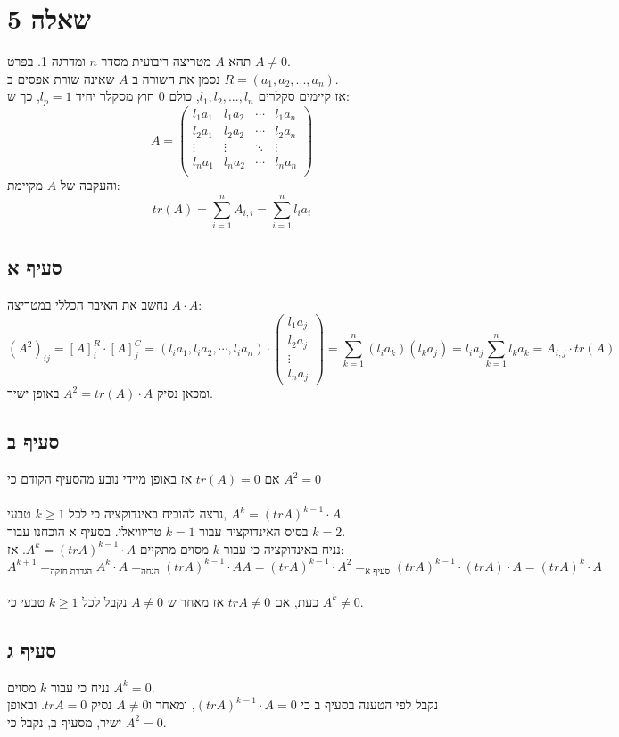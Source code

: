 \documentclass{article}
\DeclareMathOperator*{\equals}{=}
\begin{document}
\pagebreak

\section*{שאלה 5}

תהא $A$ מטריצה ריבועית מסדר $n$ ומדרגה 1. בפרט $A\ne 0$. \\
נסמן את השורה ב $A$ שאינה שורת אפסים ב $R=(a_1, a_2, ..., a_n)$. \\
אז קיימים סקלרים $l_1, l_2, ..., l_n$, כולם 0 חוץ מסקלר יחיד $l_p=1$, כך ש:
\[
    A=\begin{pmatrix}
        l_1a_1 & l_1a_2 & \cdots & l_1a_n \\
        l_2a_1 & l_2a_2 & \cdots & l_2a_n \\
        \vdots & \vdots & \ddots & \vdots \\
        l_na_1 & l_na_2 & \cdots & l_na_n \\
    \end{pmatrix}
\]
והעקבה של $A$ מקיימת:
\[
    tr(A)=
    \sum_{i=1}^n A_{i, i}=
    \sum_{i=1}^n l_ia_i
\]

\subsection*{סעיף א}

נחשב את האיבר הכללי במטריצה $A\cdot A$:
\[
    (A^2)_{ij}=[A]^R_i\cdot [A]^C_j=(l_ia_1, l_ia_2, \cdots, l_ia_n) \cdot \begin{pmatrix}
        l_1a_j \\
        l_2a_j \\
        \vdots \\
        l_na_j
    \end{pmatrix}=
    \sum_{k=1}^n (l_ia_k)(l_k a_j)=
    l_i a_j \sum_{k=1}^n l_ka_k =
    A_{i,j} \cdot tr(A)
\]
ומכאן נסיק $A^2=tr(A) \cdot A$ באופן ישיר.

\subsection*{סעיף ב}
אם $tr(A)=0$ אז באופן מיידי נובע מהסעיף הקודם כי $A^2=0$\\\\
נרצה להוכיח באינדוקציה כי לכל $k\geq 1$ טבעי, $A^k=(tr A)^{k-1}\cdot A$. \\
בסיס האינדוקציה עבור $k=1$ טריוויאלי. בסעיף א הוכחנו עבור $k=2$.\\
נניח באינדוקציה כי עבור $k$ מסוים מתקיים $A^k=(tr A)^{k-1}\cdot A$. אז:
\[
    A^{k+1}\equals_{\text{הגדרת חזקה}}
    A^k \cdot A \equals_{\text{הנחה}}
    (tr A)^{k-1} \cdot AA =
    (tr A)^{k-1} \cdot A^2 \equals_{\text{סעיף א}}
    (tr A)^{k-1} \cdot (tr A) \cdot A =
    (tr A)^k \cdot A
\]
\\
כעת, אם $tr A \ne 0$ אז מאחר ש $A\ne 0$ נקבל לכל $k\geq 1$ טבעי כי $A^k\ne 0$.

\subsection*{סעיף ג}

נניח כי עבור $k$ מסוים $A^k=0$. \\
נקבל לפי הטענה בסעיף ב כי $(tr A)^{k-1} \cdot A=0$, ומאחר ו$A\ne 0$ נסיק $tr A=0$.
ובאופן ישיר, מסעיף ב, נקבל כי $A^2=0$.
\end{document}
